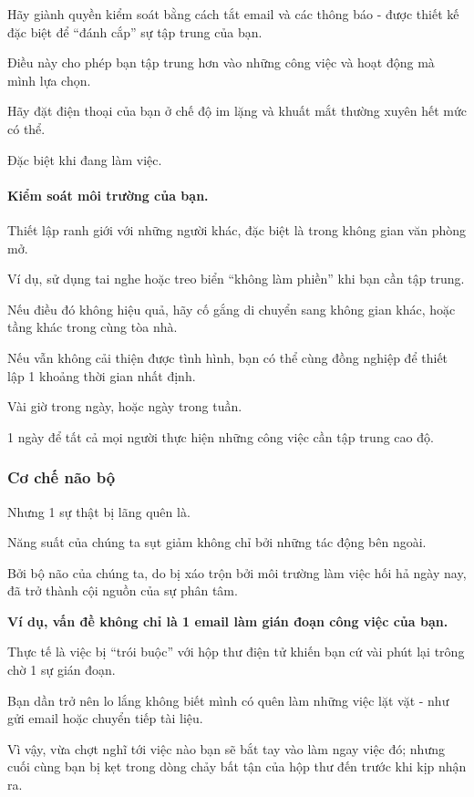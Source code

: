 \documentclass{article}
\begin{document}
Hãy giành quyền kiểm soát bằng cách tắt email và các thông báo - được thiết kế đặc biệt để ``đánh cắp'' sự tập trung của bạn.

Điều này cho phép bạn tập trung hơn vào những công việc và hoạt động mà mình lựa chọn.

Hãy đặt điện thoại của bạn ở chế độ im lặng và khuất mắt thường xuyên hết mức có thể.

Đặc biệt khi đang làm việc.

\paragraph{Kiểm soát môi trường của bạn.} Thiết lập ranh giới với những người khác, đặc biệt là trong không gian văn phòng mở.

Ví dụ, sử dụng tai nghe hoặc treo biển ``không làm phiền'' khi bạn cần tập trung.

Nếu điều đó không hiệu quả, hãy cố gắng di chuyển sang không gian khác, hoặc tầng khác trong cùng tòa nhà.

Nếu vẫn không cải thiện được tình hình, bạn có thể cùng đồng nghiệp để thiết lập 1 khoảng thời gian nhất định.

Vài giờ trong ngày, hoặc ngày trong tuần.

1 ngày để tất cả mọi người thực hiện những công việc cần tập trung cao độ.

\subsubsection{Cơ chế não bộ}
Nhưng 1 sự thật bị lãng quên là.

Năng suất của chúng ta sụt giảm không chỉ bởi những tác động bên ngoài.

Bởi bộ não của chúng ta, do bị xáo trộn bởi môi trường làm việc hối hả ngày nay, đã trở thành cội nguồn của sự phân tâm.

\textbf{Ví dụ, vấn đề không chỉ là 1 email làm gián đoạn công việc của bạn.}

Thực tế là việc bị ``trói buộc'' với hộp thư điện tử khiến bạn cứ vài phút lại trông chờ 1 sự gián đoạn.

Bạn dần trở nên lo lắng không biết mình có quên làm những việc lặt vặt - như gửi email hoặc chuyển tiếp tài liệu.

Vì vậy, vừa chợt nghĩ tới việc nào bạn sẽ bắt tay vào làm ngay việc đó; nhưng cuối cùng bạn bị kẹt trong dòng chảy bất tận của hộp thư đến trước khi kịp nhận ra.
\end{document}
